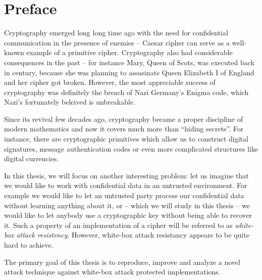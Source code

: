 \cleardoublepage{}

\chapter*{Preface}

Cryptography emerged long long time ago with the need for confidential communication in the presence of enemies -- Caesar cipher can serve as a well-known example of a primitive cipher. Cryptography also had considerable consequences in the past -- for instance Mary, Queen of Scots, was executed back in  century, because she was planning to assasinate Queen Elizabeth I of England and her cipher got broken. However, the most appreciable success of cryptography was definitely the breach of Nazi Germany's Enigma code, which Nazi's fortunately beleived is unbreakable.

Since its revival few decades ago, cryptography became a proper discipline of modern mathematics and now it covers much more than ``hiding secrets''. For instance, there are cryptographic primitives which allow us to construct digital signatures, message authentication codes or even more complicated structures like digital currencies.

In this thesis, we will focus on another interesting problem: let us imagine that we would like to work with confidential data in an untrusted environment. For example we would like to let an untrusted party process our confidential data without learning anything about it, or -- which we will study in this thesis -- we would like to let anybody use a cryptographic key without being able to recover it. Such a property of an implementation of a cipher will be referred to as {\em white-box attack resistency}. However, white-box attack resistancy appears to be quite hard to achieve.

The primary goal of this thesis is to reproduce, improve and analyze a novel attack technique against white-box attack protected implementations.


